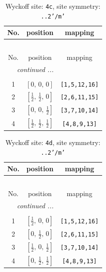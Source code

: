 \documentclass[fleqn,8pt]{jsarticle}
\begin{document}
\renewcommand{\arraystretch}{1.2}
\begin{longtable}{ccc}
\caption{Wyckoff site: {\tt 4c}, site symmetry: {\tt ..2'/m'}}
 \\
 \hline \hline
No. & position & mapping \\ \hline \endfirsthead

\multicolumn{2}{l}{\tablename\ \thetable{}} \\
 \hline \hline
No. & position & mapping \\ \hline \endhead

 \hline \hline
\multicolumn{2}{r}{\footnotesize\it continued ...} \\ \endfoot

 \hline \hline
\multicolumn{2}{r}{} \\ \endlastfoot

1 & $\left[ 0,\, 0,\, 0 \right]$ & {\tt [1,5,12,16]} \\ \hline
2 & $\left[ \frac{1}{2},\, \frac{1}{2},\, 0 \right]$ & {\tt [2,6,11,15]} \\ \hline
3 & $\left[ 0,\, 0,\, \frac{1}{2} \right]$ & {\tt [3,7,10,14]} \\ \hline
4 & $\left[ \frac{1}{2},\, \frac{1}{2},\, \frac{1}{2} \right]$ & {\tt [4,8,9,13]} \\
\end{longtable}
\renewcommand{\arraystretch}{1.2}
\begin{longtable}{ccc}
\caption{Wyckoff site: {\tt 4d}, site symmetry: {\tt ..2'/m'}}
 \\
 \hline \hline
No. & position & mapping \\ \hline \endfirsthead

\multicolumn{2}{l}{\tablename\ \thetable{}} \\
 \hline \hline
No. & position & mapping \\ \hline \endhead

 \hline \hline
\multicolumn{2}{r}{\footnotesize\it continued ...} \\ \endfoot

 \hline \hline
\multicolumn{2}{r}{} \\ \endlastfoot

1 & $\left[ \frac{1}{2},\, 0,\, 0 \right]$ & {\tt [1,5,12,16]} \\ \hline
2 & $\left[ 0,\, \frac{1}{2},\, 0 \right]$ & {\tt [2,6,11,15]} \\ \hline
3 & $\left[ \frac{1}{2},\, 0,\, \frac{1}{2} \right]$ & {\tt [3,7,10,14]} \\ \hline
4 & $\left[ 0,\, \frac{1}{2},\, \frac{1}{2} \right]$ & {\tt [4,8,9,13]} \\
\end{longtable}
\end{document}
